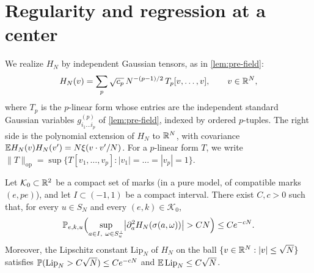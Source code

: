 \section{Regularity and regression at a center}\label{sec:mb-regression}

We realize $H_N$ by independent Gaussian tensors, as in \cref{lem:pre-field}:
\begin{equation}\label{eq:mb-tensor}
H_N(v)=\sum_p\sqrt{c_p}\,N^{-(p-1)/2}\,T_p[v,\dots,v],\qquad v\in\mathbb R^N,
\end{equation}
where $T_p$ is the $p$-linear form whose entries are the independent standard Gaussian variables $g^{(p)}_{i_1\dots i_p}$ of \cref{lem:pre-field}, indexed by ordered $p$-tuples. The right side is the polynomial extension of $H_N$ to $\mathbb R^N$, with covariance $\mathbb E H_N(v)H_N(v')=N\xi(v\cdot v'/N)$. For a $p$-linear form $T$, we write $\|T\|_{\mathrm{op}}=\sup\{T[v_1,\dots,v_p]:|v_1|=\dots=|v_p|=1\}$.

\begin{lemma}\label{lem:mb-regularity}
Let $\mathcal K_0\subset\mathbb R^2$ be a compact set of marks (in a pure model, of compatible marks $(e,pe)$), and let $I\subset(-1,1)$ be a compact interval. There exist $C,c>0$ such that, for every $u\in S_N$ and every $(e,k)\in\mathcal K_0$,
\begin{equation}\label{eq:mb-latitude-reg}
\Pp_{e,k,u}\Bigl(\sup_{a\in I,\ \omega\in S_u^\perp}\bigl|\partial_a^2H_N(\sigma(a,\omega))\bigr|>CN\Bigr)\le Ce^{-cN}.
\end{equation}
Moreover, the Lipschitz constant $\mathrm{Lip}_N$ of $H_N$ on the ball $\{v\in\mathbb R^N:|v|\le\sqrt N\}$ satisfies $\mathbb P(\mathrm{Lip}_N>C\sqrt N)\le Ce^{-cN}$ and $\mathbb E\,\mathrm{Lip}_N\le C\sqrt N$.
\end{lemma}

